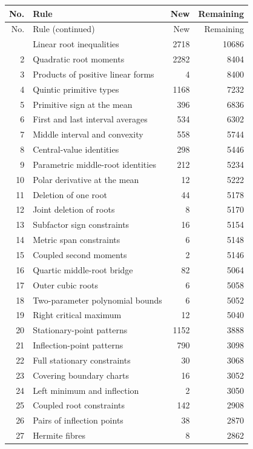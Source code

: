 \small
\begin{longtable}{r p{} r r}
\toprule
No. & Rule & New & Remaining\\
\midrule
\endfirsthead
\toprule
No. & Rule (continued) & New & Remaining\\
\midrule
\endhead
\bottomrule
\endfoot
1 & Linear root inequalities & 2718 & 10686 \\
2 & Quadratic root moments & 2282 & 8404 \\
3 & Products of positive linear forms & 4 & 8400 \\
4 & Quintic primitive types & 1168 & 7232 \\
5 & Primitive sign at the mean & 396 & 6836 \\
6 & First and last interval averages & 534 & 6302 \\
7 & Middle interval and convexity & 558 & 5744 \\
8 & Central-value identities & 298 & 5446 \\
9 & Parametric middle-root identities & 212 & 5234 \\
10 & Polar derivative at the mean & 12 & 5222 \\
11 & Deletion of one root & 44 & 5178 \\
12 & Joint deletion of roots & 8 & 5170 \\
13 & Subfactor sign constraints & 16 & 5154 \\
14 & Metric span constraints & 6 & 5148 \\
15 & Coupled second moments & 2 & 5146 \\
16 & Quartic middle-root bridge & 82 & 5064 \\
17 & Outer cubic roots & 6 & 5058 \\
18 & Two-parameter polynomial bounds & 6 & 5052 \\
19 & Right critical maximum & 12 & 5040 \\
20 & Stationary-point patterns & 1152 & 3888 \\
21 & Inflection-point patterns & 790 & 3098 \\
22 & Full stationary constraints & 30 & 3068 \\
23 & Covering boundary charts & 16 & 3052 \\
24 & Left minimum and inflection & 2 & 3050 \\
25 & Coupled root constraints & 142 & 2908 \\
26 & Pairs of inflection points & 38 & 2870 \\
27 & Hermite fibres & 8 & 2862 \\

\end{longtable}
